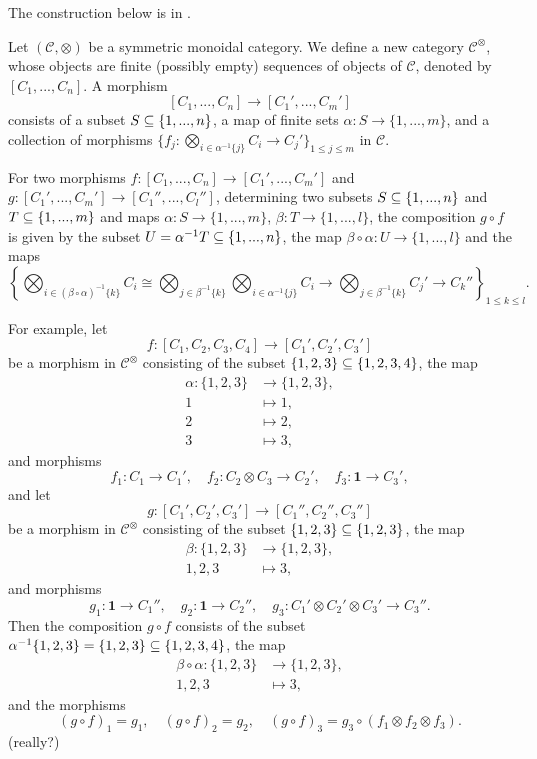 \documentclass{MetricNotes2023}
\def\subq{\ensuremath\subseteq}
\begin{document}
The construction below is in \autocite{higheralgebra}. 

Let \((\mathcal{C}, \otimes)\) be a symmetric monoidal category. We define a new category \(\mathcal{C}^\otimes\), whose objects are finite (possibly empty) sequences of objects of \(\mathcal{C}\), denoted by \([C_1, ..., C_n]\). A morphism 
\[[C_1, ..., C_n]\to [C_1', ..., C_m']\]
consists of a subset \(S \subq \{1, ..., n\}\), a map of finite sets \(\alpha : S \to \{1, ..., m\}\), and a collection of morphisms \(\{f_j : \bigotimes_{i \in \alpha^{-1}\{j\}} C_i \to C_j'\}_{1 \leq j \leq m}\) in \(\mathcal{C}\). 

For two morphisms \(f : [C_1, ..., C_n]\to [C_1', ..., C_m']\) and \(g : [C_1', ..., C_m']\to[C_1'', ..., C_l'']\), determining two subsets \(S \subq \{1, ..., n\}\) and \(T \subq \{1, ..., m\}\) and maps \(\alpha : S \to \{1, ..., m\}\), \(\beta : T \to \{1, ..., l\}\), the composition \(g \circ f\) is given by the subset \(U = \alpha^{-1}T \subq \{1, ..., n\}\), the map \(\beta \circ \alpha : U \to \{1, ..., l\}\) and the maps 
\[\left\{\bigotimes_{i \in (\beta \circ \alpha)^{-1}\{k\}} C_i \cong \bigotimes_{j \in \beta^{-1}\{k\}}\bigotimes_{i \in \alpha^{-1}\{j\}}C_i \to \bigotimes_{j \in \beta^{-1}\{k\}}C_j' \to C_k''\right\}_{1 \leq k \leq l}.\] 

For example, let 
\[f : [C_1, C_2, C_3, C_4]\to [C_1', C_2', C_3']\]
be a morphism in \(\mathcal{C}^\otimes\) consisting of the subset \(\{1, 2, 3\}\subq \{1, 2, 3, 4\}\), the map
\begin{align*}
\alpha : \{1, 2, 3\}&\to \{1, 2, 3\},\\
1 &\mapsto 1,\\
2 &\mapsto 2,\\
3 &\mapsto 3,
\end{align*}
and morphisms
\[f_1 : C_1 \to C_1', \quad f_2 : C_2 \otimes C_3 \to C_2', \quad f_3 : \textbf{1}\to C_3',\]
and let 
\[g : [C_1', C_2', C_3'] \to [C_1'', C_2'', C_3'']\]
be a morphism in \(\mathcal{C}^\otimes\) consisting of the subset \(\{1, 2, 3\}\subq \{1, 2, 3\}\), the map
\begin{align*}
\beta : \{1, 2, 3\}&\to \{1, 2, 3\},\\
1, 2, 3 &\mapsto 3,
\end{align*}
and morphisms
\[g_1 : \textbf{1} \to C_1'', \quad g_2 : \textbf{1} \to C_2'', \quad g_3 : C_1'\otimes C_2'\otimes C_3' \to C_3''.\]
Then the composition \(g \circ f \) consists of the subset \(\alpha^{-1}\{1, 2, 3\}=\{1, 2, 3\}\subq \{1, 2, 3, 4\}\), the map
\begin{align*}
\beta \circ \alpha : \{1, 2, 3\}&\to \{1, 2, 3\},\\
1, 2, 3 &\mapsto 3,
\end{align*}
and the morphisms
\[(g\circ f)_1 =g_1, \quad (g\circ f)_2 = g_2, \quad (g \circ f)_3 = g_3 \circ (f_1 \otimes f_2 \otimes f_3).\]
(really?)
\end{document}
